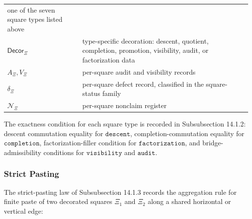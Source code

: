 \documentclass[11pt]{article}
\theoremstyle{definition}
\begin{document}
\begin{longtable}[]{@{}ll@{}}
\begin{minipage}[t]{0.47\columnwidth}
one of the seven square types listed above\strut
\end{minipage}\tabularnewline
\begin{minipage}[t]{0.47\columnwidth}\raggedright
\(\mathsf{Decor}_{\Xi}\)\strut
\end{minipage} & \begin{minipage}[t]{0.47\columnwidth}\raggedright
type-specific decoration: descent, quotient, completion, promotion, visibility, audit, or factorization data\strut
\end{minipage}\tabularnewline
\begin{minipage}[t]{0.47\columnwidth}\raggedright
\(A_{\Xi},V_{\Xi}\)\strut
\end{minipage} & \begin{minipage}[t]{0.47\columnwidth}\raggedright
per-square audit and visibility records\strut
\end{minipage}\tabularnewline
\begin{minipage}[t]{0.47\columnwidth}\raggedright
\(\delta_{\Xi}\)\strut
\end{minipage} & \begin{minipage}[t]{0.47\columnwidth}\raggedright
per-square defect record, classified in the square-status family\strut
\end{minipage}\tabularnewline
\begin{minipage}[t]{0.47\columnwidth}\raggedright
\(\mathcal N_{\Xi}\)\strut
\end{minipage} & \begin{minipage}[t]{0.47\columnwidth}\raggedright
per-square nonclaim register\strut
\end{minipage}\tabularnewline
\bottomrule
\end{longtable}

The exactness condition for each square type is recorded in Subsubsection 14.1.2: descent commutation equality for \(\texttt{descent}\), completion-commutation equality for \(\texttt{completion}\), factorization-filler condition for \(\texttt{factorization}\), and bridge-admissibility conditions for \(\texttt{visibility}\) and \(\texttt{audit}\).

\subsubsection{Strict Pasting}

The strict-pasting law of Subsubsection 14.1.3 records the aggregation rule for finite paste of two decorated squares \(\Xi_{1}\) and \(\Xi_{2}\) along a shared horizontal or vertical edge:
\end{document}
